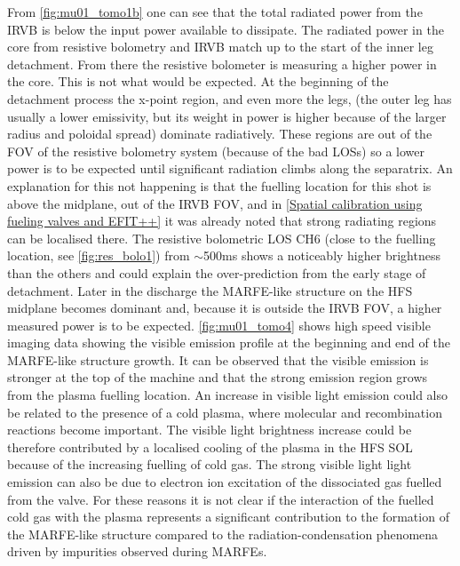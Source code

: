 From \autoref{fig:mu01_tomo1b} one can see that the total radiated power from the IRVB is below the input power available to dissipate. The radiated power in the core from resistive bolometry and IRVB match up to the start of the inner leg detachment. From there the resistive bolometer is measuring a higher power in the core. This is not what would be expected. At the beginning of the detachment process the x-point region, and even more the legs, (the outer leg has usually a lower emissivity, but its weight in power is higher because of the larger radius and poloidal spread) dominate radiatively. These regions are out of the FOV of the resistive bolometry system (because of the bad LOSs) so a lower power is to be expected until significant radiation climbs along the separatrix. An explanation for this not happening is that the fuelling location for this shot is above the midplane, out of the IRVB FOV, and in \autoref{Spatial calibration using fueling valves and EFIT++} it was already noted that strong radiating regions can be localised there. The resistive bolometric LOS CH6 (close to the fuelling location, see \autoref{fig:res_bolo1}) from $\sim$500ms shows a noticeably higher brightness than the others and could explain the over-prediction from the early stage of detachment. Later in the discharge the MARFE-like structure on the HFS midplane becomes dominant and, because it is outside the IRVB FOV, a higher measured power is to be expected. \autoref{fig:mu01_tomo4} shows high speed visible imaging data showing the visible emission profile at the beginning and end of the MARFE-like structure growth. It can be observed that the visible emission is stronger at the top of the machine and that the strong emission region grows from the plasma fuelling location. An increase in visible light emission could also be related to the presence of a cold plasma, where molecular and recombination reactions become important. The visible light brightness increase could be therefore contributed by a localised cooling of the plasma in the HFS SOL because of the increasing fuelling of cold gas. The strong visible light light emission can also be due to electron ion excitation of the dissociated gas fuelled from the valve. For these reasons it is not clear if the interaction of the fuelled cold gas with the plasma represents a significant contribution to the formation of the MARFE-like structure compared to the radiation-condensation phenomena driven by impurities observed during MARFEs.\cite{Lipschultz1984}

